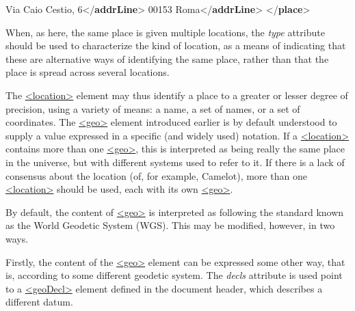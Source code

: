 \begin{shaded}
\hspace*{1em}\mbox{}\newline 
\hspace*{1em}\hspace*{1em}Via Caio Cestio, 6{</\textbf{addrLine}>}\mbox{}\newline 
\hspace*{1em}\hspace*{1em}00153 Roma{</\textbf{addrLine}>}\mbox{}\newline 
\hspace*{1em}\mbox{}\newline 
{}\mbox{}\newline 
{</\textbf{place}>}\end{shaded}\egroup\par \noindent  When, as here, the same place is given multiple locations, the {\itshape type} attribute should be used to characterize the kind of location, as a means of indicating that these are alternative ways of identifying the same place, rather than that the place is spread across several locations.\par
The \hyperref[TEI.location]{<location>} element may thus identify a place to a greater or lesser degree of precision, using a variety of means: a name, a set of names, or a set of coordinates. The \hyperref[TEI.geo]{<geo>} element introduced earlier is by default understood to supply a value expressed in a specific (and widely used) notation. If a \hyperref[TEI.location]{<location>} contains more than one \hyperref[TEI.geo]{<geo>}, this is interpreted as being really the same place in the universe, but with different systems used to refer to it. If there is a lack of consensus about the location (of, for example, Camelot), more than one \hyperref[TEI.location]{<location>} should be used, each with its own \hyperref[TEI.geo]{<geo>}.\par
By default, the content of \hyperref[TEI.geo]{<geo>} is interpreted as following the standard known as the World Geodetic System (WGS). This may be modified, however, in two ways.\par
Firstly, the content of the \hyperref[TEI.geo]{<geo>} element can be expressed some other way, that is, according to some different geodetic system. The {\itshape decls} attribute is used point to a \hyperref[TEI.geoDecl]{<geoDecl>} element defined in the document header, which describes a different datum.\par
